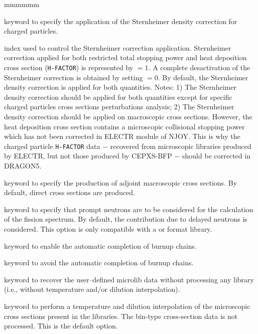 \begin{ListeDeDescription}{mmmmmm}
\item[\moc{STERN}] keyword to specify the application of the Sternheimer density correction for charged particles.

\item[\dusa{nstern}] index used to control the Sternheimer correction application. Sternheimer correction applied for both restricted total stopping power
and heat deposition cross section ({\tt H-FACTOR}) is represented by  $=1$. A complete desactivation of the Sternheimer correction is obtained
by setting  $=0$. By default, the Sternheimer density correction is applied for both quantities. Notes: 1) The Sternheimer density correction should be
applied for both quantities except for specific charged particles cross sections perturbations analysis; 2) The Sternheimer density correction should be
applied on macroscopic cross sections. However, the heat deposition cross section contains a microscopic collisional stopping power which has not been
corrected in ELECTR module of NJOY. This is why the charged particle {\tt H-FACTOR} data $-$ recovered from microscopic libraries produced by ELECTR, but not
those produced by CEPXS-BFP $-$ should be corrected in DRAGON5.

\item[\moc{ADJ}] keyword to specify the production of adjoint macroscopic
cross sections. By default, direct cross sections are produced.

\item[\moc{PROM}] keyword to specify that prompt neutrons are to be considered
for the calculation of the fission spectrum. By default, the contribution due to
delayed neutrons is considered. This option is only compatible with a
 or  format library.

\item[\moc{CDEPCHN}] keyword to enable the automatic completion of burnup chains.

\item[\moc{DDEPCHN}] keyword to avoid the automatic completion of burnup chains.

\item[\moc{SKIP}] keyword to recover the user--defined microlib data without processing
any library (i.e., without temperature and/or dilution interpolation).

\item[\moc{INTR}] keyword to perform a temperature and dilution interpolation
of the microscopic cross sections present in the libraries. The bin-type
cross-section data is not processed. This is the default option.


\end{ListeDeDescription}
